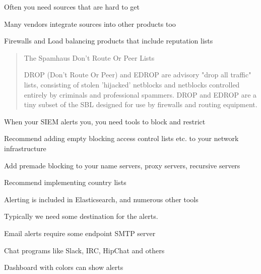 \documentclass[Screen16to9,17pt]{foils}
\begin{document}
\begin{list2}
\item Often you need sources that are hard to get
\item Many vendors integrate sources into other products too
\item Firewalls and Load balancing products that include reputation lists
\end{list2}


\begin{quote}
The Spamhaus Don't Route Or Peer Lists

DROP (Don't Route Or Peer) and EDROP are advisory "drop all traffic" lists, consisting of stolen 'hijacked' netblocks and netblocks controlled entirely by criminals and professional spammers. DROP and EDROP are a tiny subset of the SBL designed for use by firewalls and routing equipment.
\end{quote}



\begin{list2}
\item When your SIEM alerts you, you need tools to block and restrict
\item Recommend adding empty blocking access control lists etc. to your network infrastructure
\item Add premade blocking to your name servers, proxy servers, recursive servers
\item Recommend implementing country lists
\end{list2}













\begin{list1}
\item Alerting is included in Elasticsearch, and numerous other tools
\item Typically we need some destination for the alerts.
\item Email alerts require some endpoint SMTP server
\item Chat programs like Slack, IRC, HipChat and others
\item Dashboard with colors can show alerts
\end{list1}




\slidenext{}
\end{document}
